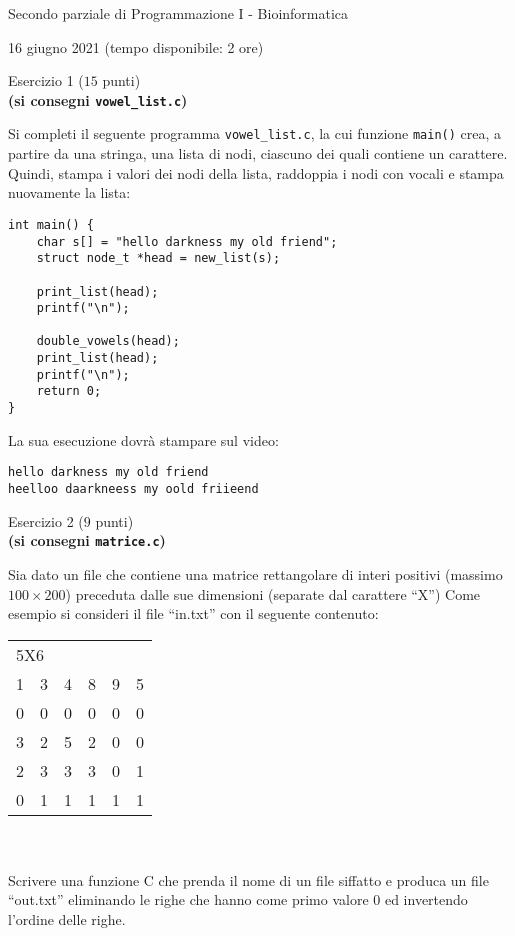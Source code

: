 \documentclass[12pt]{article}
\begin{document}
\begin{center}{\LARGE Secondo parziale di Programmazione I - Bioinformatica}\\
\begin{center}
  \large 16 giugno 2021 (tempo disponibile: 2 ore)
\end{center}
\end{center}


\vspace*{1ex}
\begin{center}{\Large Esercizio 1} ($15$ punti)\\
  \textbf{(si consegni \texttt{vowel\_list.c})}
\end{center}
Si completi il seguente programma \texttt{vowel\_list.c}, la cui funzione \texttt{main()} crea, a partire da una stringa, una lista di nodi, ciascuno dei quali contiene un carattere. Quindi, stampa i valori dei nodi della lista, raddoppia i nodi con vocali e stampa nuovamente la lista:
\begin{center}
\begin{lstlisting}[language=myC]
int main() {
    char s[] = "hello darkness my old friend";
    struct node_t *head = new_list(s);

    print_list(head);
    printf("\n");

    double_vowels(head);
    print_list(head);
    printf("\n");
    return 0;
}
\end{lstlisting}
\end{center}
La sua esecuzione dovr\`a stampare sul video:
\begin{mdframed}[backgroundcolor=lightgrey] 
\begin{verbatim}
hello darkness my old friend
heelloo daarkneess my oold friieend
\end{verbatim}
\end{mdframed}

\newpage
\begin{center}{\Large Esercizio 2} ($9$ punti)\\
  \textbf{(si consegni \texttt{matrice.c})}\end{center}
Sia dato un file che contiene una matrice rettangolare di interi positivi (massimo $100\times200$) preceduta dalle sue dimensioni (separate dal carattere ``X'') Come esempio si consideri il file ``in.txt'' con il seguente contenuto:

\begin{tabular}{llllll}
\\
\multicolumn{3}{l}{5X6}&&&\\
1& 3& 4& 8& 9&5\\
0&0&0&0&0&0\\
3& 2& 5&2& 0& 0\\
2& 3& 3& 3& 0& 1\\ 
0& 1& 1& 1& 1& 1\\
\end{tabular}
\\
\\
Scrivere una funzione C che prenda il nome di un file siffatto e produca un file ``out.txt'' eliminando le righe che hanno come primo valore 0 ed invertendo l’ordine delle righe. 
\end{document}
